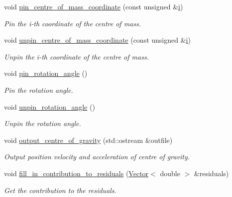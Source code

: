 \begin{DoxyCompactItemize}
void \hyperlink{classoomph_1_1ImmersedRigidBodyElement_a27f6871d3ff88b116f6fe5a653858457}{pin\+\_\+centre\+\_\+of\+\_\+mass\+\_\+coordinate} (const unsigned \&\hyperlink{cfortran_8h_adb50e893b86b3e55e751a42eab3cba82}{i})
\begin{DoxyCompactList}\small\item\em Pin the i-\/th coordinate of the centre of mass. \end{DoxyCompactList}\item 
void \hyperlink{classoomph_1_1ImmersedRigidBodyElement_afe7a383ce0bb9799103809fcbb1fa78f}{unpin\+\_\+centre\+\_\+of\+\_\+mass\+\_\+coordinate} (const unsigned \&\hyperlink{cfortran_8h_adb50e893b86b3e55e751a42eab3cba82}{i})
\begin{DoxyCompactList}\small\item\em Unpin the i-\/th coordinate of the centre of mass. \end{DoxyCompactList}\item 
void \hyperlink{classoomph_1_1ImmersedRigidBodyElement_aa90d24d3f3c3ad2e1f8fc974fe59ace7}{pin\+\_\+rotation\+\_\+angle} ()
\begin{DoxyCompactList}\small\item\em Pin the rotation angle. \end{DoxyCompactList}\item 
void \hyperlink{classoomph_1_1ImmersedRigidBodyElement_a89cf34a31797e43703321c22cc47f284}{unpin\+\_\+rotation\+\_\+angle} ()
\begin{DoxyCompactList}\small\item\em Unpin the rotation angle. \end{DoxyCompactList}\item 
void \hyperlink{classoomph_1_1ImmersedRigidBodyElement_a7c86fab683bf1d5da2051a09ac210e55}{output\+\_\+centre\+\_\+of\+\_\+gravity} (std\+::ostream \&outfile)
\begin{DoxyCompactList}\small\item\em Output position velocity and acceleration of centre of gravity. \end{DoxyCompactList}\item 
void \hyperlink{classoomph_1_1ImmersedRigidBodyElement_abeff18198ffb78f6eb4bfe90c5f0b846}{fill\+\_\+in\+\_\+contribution\+\_\+to\+\_\+residuals} (\hyperlink{classoomph_1_1Vector}{Vector}$<$ double $>$ \&residuals)
\begin{DoxyCompactList}\small\item\em Get the contribution to the residuals. \end{DoxyCompactList}\item 

\end{DoxyCompactItemize}
